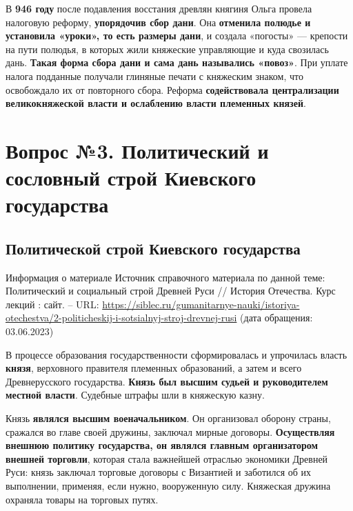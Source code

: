 \documentclass{article}
\begin{document}
В \textbf{946 году} после подавления восстания древлян княгиня Ольга провела налоговую реформу, \textbf{упорядочив сбор дани}. Она \textbf{отменила полюдье и установила «уроки», то есть размеры дани}, и создала «погосты» — крепости на пути полюдья, в которых жили княжеские управляющие и куда свозилась дань. \textbf{Такая форма сбора дани и сама дань назывались «повоз»}. При уплате налога подданные получали глиняные печати с княжеским знаком, что освобождало их от повторного сбора. Реформа \textbf{содействовала централизации великокняжеской власти и ослаблению власти племенных князей}.

\pagebreak
\section{Вопрос №3. Политический и сословный строй Киевского государства}

\subsection{Политической строй Киевского государства}

\begin{bclogo}[logo=\bcinfo, couleurBarre=orange, noborder=true, couleur=white]{Информация о материале}
    Источник справочного материала по данной теме: Политический и социальный строй Древней Руси // История Отечества. Курс лекций : сайт. – URL: \href{https://siblec.ru/gumanitarnye-nauki/istoriya-otechestva/2-politicheskij-i-sotsialnyj-stroj-drevnej-rusi}{https://siblec.ru/gumanitarnye-nauki/istoriya-otechestva/2-politicheskij-i-sotsialnyj-stroj-drevnej-rusi} (дата обращения: 03.06.2023)
\end{bclogo}

В процессе образования государственности сформировалась и упрочилась власть \textbf{князя}, верховного правителя племенных образований, а затем и всего Древнерусского государства. \textbf{Князь был высшим судьей и руководителем местной власти}. Судебные штрафы шли в княжескую казну.

Князь \textbf{являлся высшим военачальником}. Он организовал оборону страны, сражался во главе своей дружины, заключал мирные договоры. \textbf{Осуществляя внешнюю политику государства, он являлся главным организатором внешней торговли}, которая стала важнейшей отраслью экономики Древней Руси: князь заключал торговые договоры с Византией и заботился об их выполнении, применяя, если нужно, вооруженную силу. Княжеская дружина охраняла товары на торговых путях.
\end{document}
